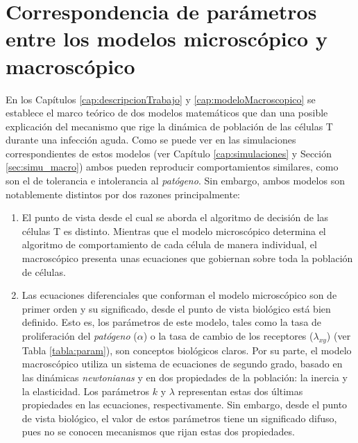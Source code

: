 \chapter{Correspondencia de parámetros entre los modelos microscópico y macroscópico}
\label{cap:redNeuronal}

En los Capítulos \ref{cap:descripcionTrabajo} y \ref{cap:modeloMacroscopico} se establece el marco teórico de dos modelos matemáticos que dan una posible explicación del mecanismo que rige la dinámica de población de las células T durante una infección aguda. Como se puede ver en las simulaciones correspondientes de estos modelos (ver Capítulo \ref{cap:simulaciones} y Sección \ref{sec:simu_macro}) ambos pueden reproducir comportamientos similares, como son el de tolerancia e intolerancia al \textit{patógeno}. Sin embargo, ambos modelos son notablemente distintos por dos razones principalmente: 

\begin{enumerate}
	\item El punto de vista desde el cual se aborda el algoritmo de decisión de las células T es distinto. Mientras que el modelo microscópico determina el algoritmo de comportamiento de cada célula de manera individual, el macroscópico presenta unas ecuaciones que gobiernan sobre toda la población de células. 
	
	\item Las ecuaciones diferenciales que conforman el modelo microscópico son de primer orden y su significado, desde el punto de vista biológico está bien definido. Esto es, los parámetros de este modelo, tales como la tasa de proliferación del \textit{patógeno} ($\alpha$) o la tasa de cambio de los receptores ($\lambda_{xy}$) (ver Tabla \ref{tabla:param}), son conceptos biológicos claros. Por su parte, el modelo macroscópico utiliza un sistema de ecuaciones de segundo grado, basado en las dinámicas \textit{newtonianas} y en dos propiedades de la población: la inercia y la elasticidad. Los parámetros $k$ y $\lambda$ representan estas dos últimas propiedades en las ecuaciones, respectivamente. Sin embargo, desde el punto de vista biológico, el valor de estos parámetros tiene un significado difuso, pues no se conocen mecanismos que rijan estas dos propiedades.
	
\end{enumerate}

